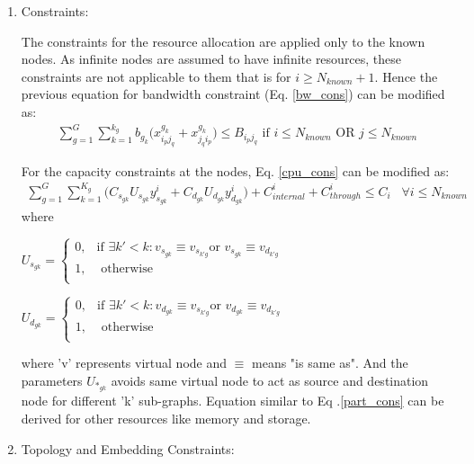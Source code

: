 \documentclass[article,dr=phil,type=msc ,colorback,accentcolor=tud4b]{tudthesis}
\begin{document}
\begin{enumerate}[label=(\Alph*)]
	\item Constraints:
	
	The constraints for the resource allocation are applied only to the known nodes. As infinite nodes are assumed to have infinite resources, these constraints are not applicable to them that is for $i \geq N_{known} + 1$. Hence the previous equation for bandwidth constraint (Eq. \ref{bw_cons}) can be modified as:
	\begin{equation}  
	\begin{split}
	\sum_{g=1}^{G} \sum_{k=1}^{k_{g}} b_{g_{k}} \big(x_{i_{p}j_{q}}^{g_{k}} + x_{j_{q}i_{p}}^{g_{k}}\big) \leq B_{i_{p}j_{q}} \text{ if } i \leq N_{known} \text{ OR } j \leq N_{known}
	\end{split}
	\end{equation} 
	
	For the capacity constraints at the nodes, Eq. \ref{cpu_cons} can be modified as: 
	\begin{equation}  \label{part_cons}
	\begin{split}
	\sum_{g=1}^{G} \sum_{k=1}^{K_{g}} \big( C_{s_{gk}} U_{s_{gk}}  y^{i}_{s_{gk}} +  C_{d_{gk}} U_{d_{gk}} y^{i}_{d_{gk}} \big) + C_{internal}^{i} + C_{through}^{i} \leq C_{i} \;\;\; \forall i \leq N_{known}
	\end{split}
	\end{equation} 
	where \newline
	
	$U_{s_{gk}} = \begin{cases}
	0, & \text{if }  \exists k' < k: v_{s_{gk}} \equiv v_{s_{k'g}} \text{or } v_{s_{gk}} \equiv v_{d_{k'g}} \\
	1, & \text{ otherwise} \\
	\end{cases}$	
	
	$U_{d_{gk}} = \begin{cases}
	0, & \text{if }  \exists k' < k: v_{d_{gk}} \equiv v_{s_{k'g}} \text{or } v_{d_{gk}} \equiv v_{d_{k'g}} \\
	1, & \text{ otherwise} \\
	\end{cases}$	
	
	
	where 'v' represents virtual node and $\equiv$ means "is same as". And the parameters $U_{*_{gk}}$ avoids same virtual node to act as source and destination node for different 'k' sub-graphs. Equation similar to Eq .\ref{part_cons} can be derived for other resources like memory and storage.  
	\item Topology and Embedding Constraints: 
	

\end{enumerate}
\end{document}
